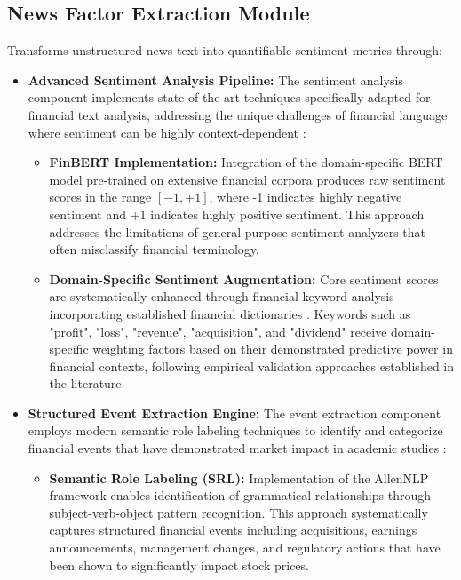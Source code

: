 \documentclass[3p,times,procedia]{elsarticle}
\begin{document}
\subsection{{News Factor Extraction Module}}

Transforms unstructured news text into quantifiable sentiment metrics \cite{TETLOCK2007,Schumaker2009} through:

\begin{itemize}
\item \textbf{Advanced Sentiment Analysis Pipeline:} The sentiment analysis component implements state-of-the-art techniques specifically adapted for financial text analysis, addressing the unique challenges of financial language where sentiment can be highly context-dependent \cite{Loughran2011}:

\begin{itemize}
\item \textbf{FinBERT Implementation:} Integration of the domain-specific BERT model pre-trained on extensive financial corpora \cite{Araci2019,Devlin2019} produces raw sentiment scores in the range $[-1, +1]$, where -1 indicates highly negative sentiment and +1 indicates highly positive sentiment. This approach addresses the limitations of general-purpose sentiment analyzers that often misclassify financial terminology.

\item \textbf{Domain-Specific Sentiment Augmentation:} Core sentiment scores are systematically enhanced through financial keyword analysis incorporating established financial dictionaries \cite{Loughran2011}. Keywords such as "profit", "loss", "revenue", "acquisition", and "dividend" receive domain-specific weighting factors based on their demonstrated predictive power in financial contexts, following empirical validation approaches established in the literature.
\end{itemize}

\item \textbf{Structured Event Extraction Engine:} The event extraction component employs modern semantic role labeling techniques to identify and categorize financial events that have demonstrated market impact in academic studies \cite{Ding2015,Daniel1998}:

\begin{itemize}
\item \textbf{Semantic Role Labeling (SRL):} Implementation of the AllenNLP framework \cite{Gardner2018,Shi2017} enables identification of grammatical relationships through subject-verb-object pattern recognition. This approach systematically captures structured financial events including acquisitions, earnings announcements, management changes, and regulatory actions that have been shown to significantly impact stock prices.


\end{itemize}
\end{itemize}
\end{document}
